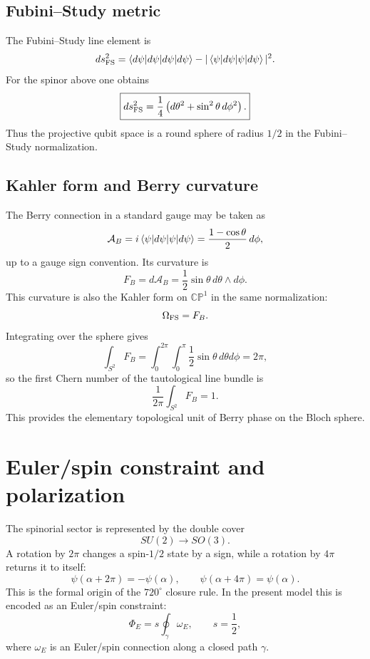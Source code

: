 \documentclass[11pt,a4paper]{article}
\begin{document}
\subsection{Fubini--Study metric}
The Fubini--Study line element is
\begin{equation}
 ds_{\rm FS}^2=\braket{d\psi|d\psi}-|\braket{\psi|d\psi}|^2.
\end{equation}
For the spinor above one obtains
\begin{equation}
\boxed{ds_{\rm FS}^2=\frac14\left(d\theta^2+\sin^2\theta\,d\phi^2\right).}
\end{equation}
Thus the projective qubit space is a round sphere of radius $1/2$ in the Fubini--Study normalization.

\subsection{Kahler form and Berry curvature}
The Berry connection in a standard gauge may be taken as
\begin{equation}
\mathcal A_B=i\braket{\psi|d\psi}=\frac{1-\cos\theta}{2}\,d\phi,
\end{equation}
up to a gauge sign convention.  Its curvature is
\begin{equation}
\boxed{F_B=d\mathcal A_B=\frac12\sin\theta\,d\theta\wedge d\phi.}
\end{equation}
This curvature is also the Kahler form on $\mathbb{CP}^{1}$ in the same normalization:
\begin{equation}
\Omega_{\rm FS}=F_B.
\end{equation}
Integrating over the sphere gives
\begin{equation}
\int_{S^2}F_B=\int_0^{2\pi}\int_0^\pi \frac12\sin\theta\,d\theta d\phi=2\pi,
\end{equation}
so the first Chern number of the tautological line bundle is
\begin{equation}
\boxed{\frac{1}{2\pi}\int_{S^2}F_B=1.}
\end{equation}
This provides the elementary topological unit of Berry phase on the Bloch sphere.

\section{Euler/spin constraint and polarization}
The spinorial sector is represented by the double cover
\begin{equation}
SU(2)\longrightarrow SO(3).
\end{equation}
A rotation by $2\pi$ changes a spin-$1/2$ state by a sign, while a rotation by $4\pi$ returns it to itself:
\begin{equation}
\boxed{\psi(\alpha+2\pi)=-\psi(\alpha),\qquad \psi(\alpha+4\pi)=\psi(\alpha).}
\end{equation}
This is the formal origin of the $720^\circ$ closure rule.  In the present model this is encoded as an Euler/spin constraint:
\begin{equation}
\Phi_E=s\oint_\gamma \omega_E,
\qquad s=\frac12,
\end{equation}
where $\omega_E$ is an Euler/spin connection along a closed path $\gamma$.
\end{document}
